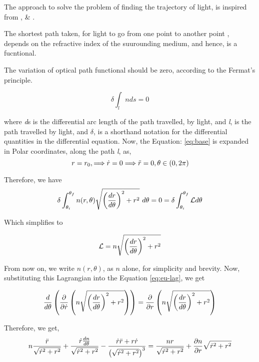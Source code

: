 \documentclass[a4paper]{article}
\begin{document}
The approach to solve the problem of finding the trajectory of light, is inspired from \cite{gri}, \cite{arc} \& \cite{thornton}.

The shortest path taken, for light to go from one point to another point , depends on the refractive index of the suurounding medium, and hence, is a fucntional.

The variation of optical path functional should be zero, according to the Fermat's principle.

\begin{equation}
    \delta\int_{\textit{l}}{nds} = 0 \label{eq:base}
\end{equation}

where \textit{d}s is the differential arc length of the path travelled, by light, and \textit{l}, is the path travelled by light, and $\delta$, is a shorthand notation for the differential quantities in the differential equation.
Now, the Equation: \ref{eq:base} is expanded in Polar coordinates, along the path \textit{l}, as, \\
\begin{equation}
 \begin{centering}
     r = r_{0}, \Longrightarrow \dot r = 0 \Longrightarrow \ddot r = 0\label{path},\theta \in (0,2\pi) \label{path}
 \end{centering}
 \end{equation}

Therefore, we have
\begin{equation}
    \delta\int_{\theta_i}^{\theta_f}{n(r,\theta)\sqrt{\left( {dr\over d\theta}\right)^{2}+ {r}^{2}}\ d\theta} = 0 = \delta\int_{\theta_i}^{\theta_f}{\mathcal{L}d\theta} \label{eq:base_s_1}
\end{equation}

Which simplifies to 

\begin{equation}
    \mathcal{L} = n\sqrt{\left({dr\over d\theta}\right)^{2}+ {r}^{2}}
\end{equation}

From now on, we write $n(r,\theta)$, as $n$ alone, for simplicity and brevity. Now, substituting this Lagrangian into the Equation \ref{eq:eu-lag}, we get

\begin{equation}
    {d\over d\theta}\left({\partial\over\partial\dot{r}}\left({{n\sqrt{\left({dr\over d\theta}\right)^{2}+ {r}^{2}}}}\right)\right) = {{\partial\over\partial{r}}\left(n\sqrt{\left({dr\over d\theta}\right)^{2}+ {r}^{2}}\right)}
\end{equation}

    Therefore, we get,
\begin{equation} 
   n{\ddot r\over\sqrt{{\dot r}^{2}+{r}^{2}}} + {\dot r{dn\over d\theta}\over{\sqrt{{\dot r}^{2}+{r}^{2}}}}-{\dot r \ddot r + r\dot r\over \left({\sqrt{{\dot r}^{2}+{r}^{2}}}\right)^3}= {nr \over \sqrt{{\dot r}^{2}+{r}^{2}}}+ {\partial n \over \partial r} \sqrt{{\dot r}^{2}+{r}^{2}}
\end{equation}
\end{document}
